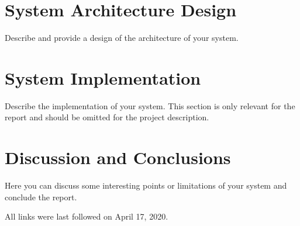 \documentclass[runningheads]{llncs}
\begin{document}
\section{System Architecture Design}
Describe and provide a design of the architecture of your system.

\section{System Implementation}
Describe the implementation of your system. This section is only relevant for the report and should be omitted for the project description. 

\section{Discussion and Conclusions}
Here you can discuss some interesting points or limitations of your system and conclude the report.

%
%



All links were last followed on April 17, 2020.
\end{document}
